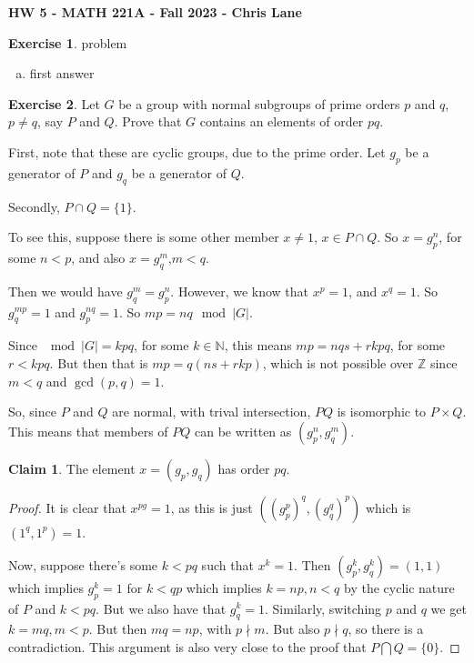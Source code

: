 \documentclass[11pt,oneside]{article}
\numberwithin{equation}{section}
\theoremstyle{definition}
\newtheorem{exercise}{Exercise}
\newtheorem*{claim}{Claim}
\def\ZZ{\mathbb{Z}}
\def\NN{\mathbb{N}}
\begin{document}
\textbf{HW 5 - MATH 221A - Fall 2023 - Chris Lane}


\begin{exercise}
  problem
\end{exercise}
\begin{solution}
  \begin{enumerate}[(a)]
  \item
    first answer
  \end{enumerate}
\end{solution}

\begin{exercise}
  \label{ex2}
  Let $G$ be a group with normal subgroups of prime orders $p$ and
  $q$, $p \neq q$, say $P$ and $Q$. Prove that $G$ contains an
  elements of order $pq$.
\end{exercise}
\begin{solution}
  First, note that these are cyclic groups, due to the prime order.  Let
  $g_p$ be a generator of $P$ and $g_q$ be a generator of $Q$. 

  Secondly, $P \cap Q = \{1\}$.
  
  To see this, suppose there is some other
  member $ x \neq 1$, $x \in P \cap Q$.  So $x = g_p^n$, for some $n < p$, and
  also $x=g_q^m$,$m < q$.

  Then we would have $ g_q ^m = g_p^n$.  However, we know that $x ^ p
  = 1$, and $x^q = 1$.  So $g_q ^ {m p } = 1$ and $g_p ^ {n q} = 1$.
  So $mp = nq \mod |G|$.

  
  Since $ \mod |G| = k p q$, for some $k \in \NN$, this means $mp = nqs + rkpq$, for some
  $ r < k p q$.  But then that is $mp = q ( ns + rkp)$, which is not possible
  over $\ZZ$ since $m < q$ and $\gcd(p, q) = 1$.

  So, since $P$ and $Q$ are normal, with trival intersection, $PQ$ is isomorphic to $P \times Q$.
  This means that members of $ PQ$ can be written as $(g_p^n, g_q^m)$.

  \begin{claim}
    The element $x = (g_p, g_q)$ has order $pq$.
  \end{claim}
  \begin{proof}
    It is clear that $x ^ {pg} = 1$, as this is just $((g_p ^ p)^q, (g_q^q)^p)$ which is $(1^q, 1^p) = 1$.
    
    Now, suppose there's some $k < pq$ such that $x^k = 1$.  Then
    $(g_p^k, g_q^k) = (1, 1)$ which implies $g_p^k = 1$ for $k < qp$
    which implies $ k = np, n<q$ by the cyclic nature of $P$ and $k<pq$.
    But we also have that $g_q ^ k =1$.  Similarly, switching $p$ and
    $q$ we get $k = mq, m < p$.  But then $mq = np$, with $ p \nmid m$.
    But also $p \nmid q$, so there is a contradiction.  This argument is
    also very close to the proof that $P \bigcap Q = \{0\}$.
  \end{proof}
\end{solution}
\end{document}
